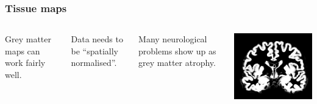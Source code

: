 \begin{frame}
\frametitle{Tissue maps}
\begin{columns}[c]
Grey matter maps can work fairly well.\par
Data needs to be ``spatially normalised''.\par
Many neurological problems show up as grey matter atrophy.\par
{}
\includegraphics[width=\textwidth]{brain-GM}
\end{columns}
\end{frame}


